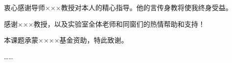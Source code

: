 \begin{acknowledgements}
衷心感谢导师×××教授对本人的精心指导。他的言传身教将使我终身受益。

感谢×××教授，以及实验室全体老师和同窗们的热情帮助和支持！

本课题承蒙××××基金资助，特此致谢。

……
\end{acknowledgements}
